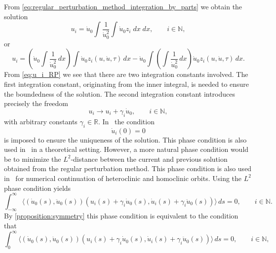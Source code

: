 From \cref{eq:regular_perturbation_method_integration_by_parts} we obtain the
solution
\begin{equation}
    \label{eq:u_i_RP}
    u_i = \dot u_0 \int \frac{1}{\dot u_0^2} \int \dot u_0 z_i \; dx \; dx,
        \qquad i \in \mathbb N,
\end{equation}
or
\begin{equation*}
    u_i = \left( \dot u_0 \int \frac{1}{\dot u_0^2} \, dx \right) \int \dot u_0 z_i(u,\dot u,\tau) \, dx
-  \dot u_0 \int \left( \int \frac{1}{\dot u_0^2} \, dx \right) \dot u_0 z_i(u,\dot u,\tau) \, dx. 
\end{equation*}
From \cref{eq:u_i_RP} we see that there are two integration constants involved.
The first integration constant, originating from the inner integral, is needed
to ensure the boundedness of the solution. The second integration constant
introduces precisely the freedom 
\begin{equation*}
    u_i \rightarrow u_i + \gamma_i \dot u_0,  \qquad i\in\mathbb N,
\end{equation*}
with arbitrary constants $\gamma_i\in\mathbb{R}$. In~\cite{Kuznetsov2014improved} the
condition
\begin{equation}
    \label{eq:RP_phase_condtion_unnatural}
    \dot u_i(0) = 0
\end{equation}
is imposed to ensure the uniqueness of the solution.  This phase condition is also
used in~\cite{Beyn_1994} in a theoretical setting. However, a more natural phase
condition would be to minimize the $L^2$-distance between the current and
previous solution obtained from the regular perturbation method. This
phase condition is also used in~\cite{Doedel1986auto, Champneys1996,
DeWitte2012,Doedel@1989} for numerical continuation of heteroclinic and
homoclinic orbits. Using the $L^2$ phase condition yields
\begin{equation*}
  \int_{-\infty}^\infty 
        \langle 
            (\dot u_0(s), \ddot u_0(s)) (u_{i}(s) + \gamma_i \dot u_0(s),
            \dot u_{i}(s) + \gamma_i \ddot u_0(s)) 
        \rangle
        \, ds = 0,
    \qquad i \in \mathbb{N}.
\end{equation*}
By \cref{proposition:symmetry} this phase condition is
equivalent to the condition that
\begin{equation}
     \label{eq:u_i_L2_phase_condition}
  \int_0^\infty 
        \langle
        (\dot u_0(s), \ddot u_0(s)) (u_{i}(s) + \gamma_i \dot u_0(s),
        \dot u_{i}(s) + \gamma_i \ddot u_0(s)) 
        \rangle
        \, ds = 0,
    \qquad i \in \mathbb{N},
\end{equation}
